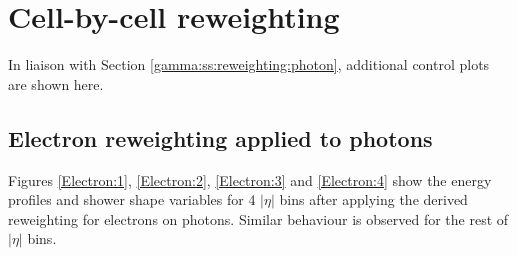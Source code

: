 \chapter{Cell-by-cell reweighting}
In liaison with Section \ref{gamma:ss:reweighting:photon}, additional control plots are shown here.
\section{Electron reweighting applied to photons}
\label{Adx1:Electron}
Figures \ref{Electron:1}, \ref{Electron:2}, \ref{Electron:3} and \ref{Electron:4} show the energy profiles and shower shape variables for 4 $|\eta|$ bins after applying the derived reweighting for electrons on photons. Similar behaviour is observed for the rest of $|\eta|$ bins.  
\begin{figure}[htbp]
    \centering
	 \\

\end{figure}

